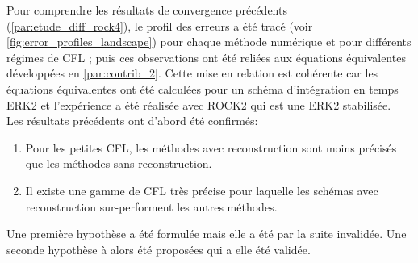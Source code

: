 Pour comprendre les résultats de convergence précédents (\ref{par:etude_diff_rock4}), le profil des erreurs a été tracé (voir \ref{fig:error_profiles_landscape}) pour chaque méthode numérique et pour différents régimes de CFL ; puis 
ces observations ont été reliées aux équations équivalentes développées en \ref{par:contrib_2}. 
Cette mise en relation est cohérente car les équations équivalentes ont été calculées pour un schéma d'intégration en temps ERK2 et l'expérience a été réalisée avec 
ROCK2 qui est une ERK2 stabilisée.\\
Les résultats précédents ont d'abord été confirmés:
\begin{enumerate}
    \item Pour les petites CFL, les méthodes avec reconstruction sont moins précisés que les méthodes sans reconstruction.
    \item Il existe une gamme de CFL très précise pour laquelle les schémas avec reconstruction sur-performent les autres méthodes.
\end{enumerate}
Une première hypothèse a été formulée mais elle a été par la suite invalidée. Une seconde hypothèse à alors été proposées qui a elle été validée.
